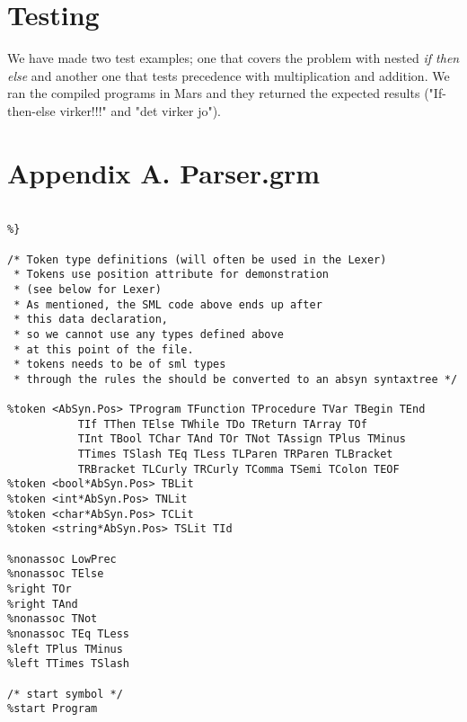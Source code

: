 \documentclass[12pt,a4paper,english]{article}
\begin{document}
\newpage
\section{Testing}
We have made two test examples; one that covers the problem with nested \textit{if then else} and another one that tests precedence with multiplication and addition. We ran the compiled programs in Mars and they returned the expected results ("If-then-else virker!!!" and "det virker jo").


\newpage

\section{Appendix A. Parser.grm}
\begin{lstlisting}[caption=The tokens and precedence rules for our grammar in Parser.grm.]
%{ 
   
%}

/* Token type definitions (will often be used in the Lexer)
 * Tokens use position attribute for demonstration 
 * (see below for Lexer)
 * As mentioned, the SML code above ends up after
 * this data declaration,
 * so we cannot use any types defined above
 * at this point of the file.
 * tokens needs to be of sml types
 * through the rules the should be converted to an absyn syntaxtree */

%token <AbSyn.Pos> TProgram TFunction TProcedure TVar TBegin TEnd 
		   TIf TThen TElse TWhile TDo TReturn TArray TOf 
		   TInt TBool TChar TAnd TOr TNot TAssign TPlus TMinus 
		   TTimes TSlash TEq TLess TLParen TRParen TLBracket 
		   TRBracket TLCurly TRCurly TComma TSemi TColon TEOF
%token <bool*AbSyn.Pos> TBLit
%token <int*AbSyn.Pos> TNLit
%token <char*AbSyn.Pos> TCLit
%token <string*AbSyn.Pos> TSLit TId

%nonassoc LowPrec
%nonassoc TElse
%right TOr
%right TAnd
%nonassoc TNot
%nonassoc TEq TLess
%left TPlus TMinus
%left TTimes TSlash

/* start symbol */
%start Program
\end{lstlisting}
\end{document}
